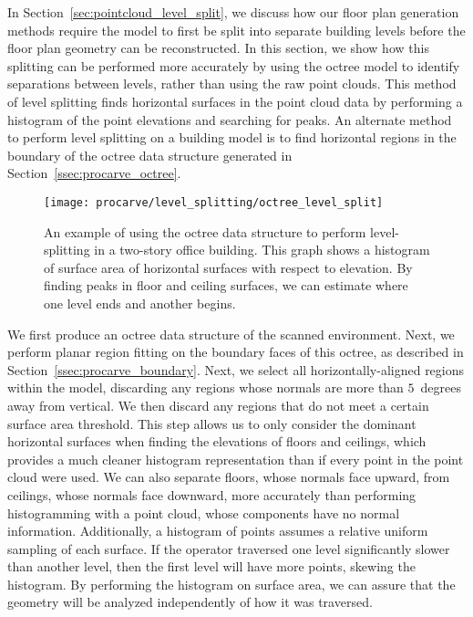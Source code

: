 \documentclass[12pt,onecolumn,oneside]{book}
\begin{document}
In Section~\ref{sec:pointcloud_level_split}, we discuss how our floor plan generation methods require the model to first be split into separate building levels before the floor plan geometry can be reconstructed.  In this section, we show how this splitting can be performed more accurately by using the octree model to identify separations between levels, rather than using the raw point clouds.  This method of level splitting finds horizontal surfaces in the point cloud data by performing a histogram of the point elevations and searching for peaks.  An alternate method to perform level splitting on a building model is to find horizontal regions in the boundary of the octree data structure generated in Section~\ref{ssec:procarve_octree}.  

\begin{figure}[t]
	\centerline{\texttt{[image: procarve/level\_splitting/octree\_level\_split]}}

	\caption[Using octree to find levels of two-story dataset.]{An example of using the octree data structure to perform level-splitting in a two-story office building.  This graph shows a histogram of surface area of horizontal surfaces with respect to elevation.  By finding peaks in floor and ceiling surfaces, we can estimate where one level ends and another begins.}
	\label{fig:octree_level_split}
\end{figure}

We first produce an octree data structure of the scanned environment.  Next, we perform planar region fitting on the boundary faces of this octree, as described in Section~\ref{ssec:procarve_boundary}.  Next, we select all horizontally-aligned regions within the model, discarding any regions whose normals are more than $5$~degrees away from vertical.  We then discard any regions that do not meet a certain surface area threshold.  This step allows us to only consider the dominant horizontal surfaces when finding the elevations of floors and ceilings, which provides a much cleaner histogram representation than if every point in the point cloud were used.  We can also separate floors, whose normals face upward, from ceilings, whose normals face downward, more accurately than performing histogramming with a point cloud, whose components have no normal information.  Additionally, a histogram of points assumes a relative uniform sampling of each surface.  If the operator traversed one level significantly slower than another level, then the first level will have more points, skewing the histogram.  By performing the histogram on surface area, we can assure that the geometry will be analyzed independently of how it was traversed.
\end{document}
